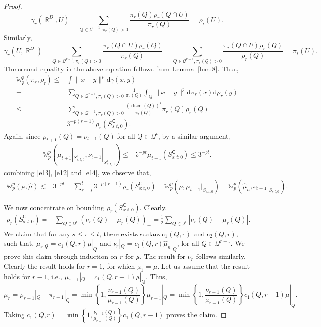 \documentclass[12pts]{article}
\def\Real{\mathop{\mathbb{R}}\nolimits}
\newcommand{\diff}{\mathrm{d}}
\newcommand{\sQ}{ \mathscr{Q}}
\newcommand{\hmu}{\hat{\mu}}
\newcommand{\fW}{\mathbb{W}}
\begin{document}
\begin{proof}
 \[\gamma_r(\Real^D, U) = \sum_{ Q \in  \sQ^{r-1}, \pi_r(Q) > 0} \frac{\pi_r(Q)  \rho_r (Q\cap U)}{\pi_r(Q)} = \rho_r(U). \]
 Similarly,
 \[\gamma_r(U, \Real^D) = \sum_{ Q \in  \sQ^{r-1}, \pi_r(Q) > 0} \frac{\pi_r(Q \cap U)  \rho_r (Q )}{\pi_r(Q)} =  \sum_{ Q \in  \sQ^{r-1}, \pi_r(Q) > 0} \frac{\pi_r(Q \cap U)  \rho_r (Q)}{\rho_r(Q)} = \pi_r(U). \]
 The second equality in the above equation follows from Lemma~\ref{lem:8}. Thus,
 \begin{align}
     \fW_p^p(\pi_r, \rho_r) \le & \int \|x-y\|^p \diff  \gamma(x,y)\nonumber\\
     = & \sum_{ Q \in  \sQ^{r-1}, \pi_r(Q) > 0} \frac{1}{\pi_r(Q)} \int_Q \|x-y\|^p \diff \pi_r(x) \diff  \rho_r(y) \nonumber\\
     \le & \sum_{ Q \in  \sQ^{r-1}, \pi_r(Q) > 0} \frac{(\operatorname{diam}(Q))^p }{\pi_r(Q)}  \pi_r(Q) \rho_r(Q) \nonumber\\
     = & 3^{-p(r-1)} \rho_r(S_{s:t,0}^\mathsf{C}). \label{e12}
 \end{align}
 Again, since $\mu_{t+1}(Q) = \nu_{t+1}(Q)$ for all $Q \in \sQ^t$, by a similar argument,
 \begin{align}
     \fW_p^p(\mu_{t+1}|_{S_{s:t,0}^\mathsf{C}}, \nu_{t+1}|_{S_{s:t,0}^\mathsf{C}}) \le &  3^{-pt} \mu_{t+1}(S_{s:t:0}^\mathsf{C}) \le 3^{-pt}. \label{e14}
 \end{align}
 combining \eqref{e13}, \eqref{e12} and \eqref{e14}, we observe that,
 \begin{align}
     \fW_p^p(\mu, \hmu) \lesssim & 3^{-p t} + \sum_{r=s}^t 3^{-p(r-1)} \rho_r(S_{s:t,0}^\mathsf{C}) + \fW_p^p(\mu, \mu_{t+1}|_{S_{s:t,0}}) + \fW_p^p(\hmu_n, \nu_{t+1}|_{S_{s:t,0}}). \label{e15}
 \end{align}

 We now concentrate on bounding $\rho_r(S_{s:t,0}^\mathsf{C})$. Clearly, 
 \begin{align}
     \rho_r(S_{s:t,0}^\mathsf{C}) = & \sum_{Q \in \sQ^{r}} (\nu_r(Q) - \mu_r(Q))_+ = \frac{1}{2} \sum_{Q \in \sQ^{r}} |\nu_r(Q) - \mu_r(Q)| .\label{e16}
 \end{align}
 We claim that for any $s \le r \le t$, there exists scalars $c_1(Q,r)$ and $c_2(Q,r)$, such that,  $\mu_r|_Q = c_1(Q,r) \mu|_Q $ and $\nu_r|_Q = c_2(Q,r) \hmu_n|_Q$, for all $Q \in \sQ^{r-1}$. We prove this claim through induction on $r$ for $\mu$. The result for $\nu_r$ follows similarly.  Clearly the result holds for $r = 1$, for which $\mu_1 = \mu$. Let us assume that the result holds for $r-1$, i.e., $\mu_{r-1}|_Q = c_1(Q,r-1) \mu|_Q$. Thus,
 \[\mu_r = \mu_{r-1}|_Q - \pi_{r-1}|_Q =  \min\left\{ 1, \frac{\nu_{r-1}(Q)}{\mu_{r-1}(Q)}\right\} \mu_{r-1}|_Q = \min\left\{ 1, \frac{\nu_{r-1}(Q)}{\mu_{r-1}(Q)}\right\} c_1(Q,r-1) \mu|_Q .\]
 Taking $c_1(Q,r) = \min\left\{ 1, \frac{\nu_{r-1}(Q)}{\mu_{r-1}(Q)}\right\} c_1(Q,r-1)$ proves the claim.


\end{proof}
\end{document}
